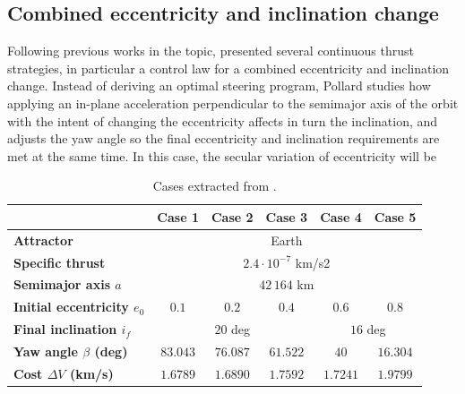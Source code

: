\subsection{Combined eccentricity and inclination change}

Following previous works in the topic, \cite{pollard2000simplified} presented several continuous thrust strategies, in particular a control law for a combined eccentricity and inclination change. Instead of deriving an optimal steering program, Pollard studies how applying an in-plane acceleration perpendicular to the semimajor axis of the orbit with the intent of changing the eccentricity affects in turn the inclination, and adjusts the yaw angle so the final eccentricity and inclination requirements are met at the same time. In this case, the secular variation of eccentricity will be

\begin{table}[b]
\centering
\begin{tabular}{|l|c|c|c|c|c|}
\hline
                                    & Case 1   & Case 2   & Case 3   & Case 4        & Case 5        \\ \hline
\textbf{Attractor}                  & \multicolumn{5}{c|}{Earth}                                     \\ \hline
\textbf{Specific thrust}            & \multicolumn{5}{c|}{$2.4 \cdot 10^{-7}$ km/s2}                 \\ \hline
\textbf{Semimajor axis $a$}         & \multicolumn{5}{c|}{$42\,164$ km}                              \\ \hline
\textbf{Initial eccentricity $e_0$} & $0.1$    & $0.2$    & $0.4$    & $0.6$         & $0.8$         \\ \hline
\textbf{Final inclination $i_f$}    & \multicolumn{3}{c|}{$20$ deg}  & \multicolumn{2}{c|}{$16$ deg} \\ \hline
\textbf{Yaw angle $\beta$ (deg)}    & $83.043$ & $76.087$ & $61.522$ & $40$          & $16.304$      \\ \hline
\textbf{Cost $\Delta V$ (km/s)}     & $1.6789$ & $1.6890$ & $1.7592$ & $1.7241$      & $1.9799$      \\ \hline
\end{tabular}
\caption{Cases extracted from \cite{pollard2000simplified}.}
\label{tab:geoinc}
\end{table}

